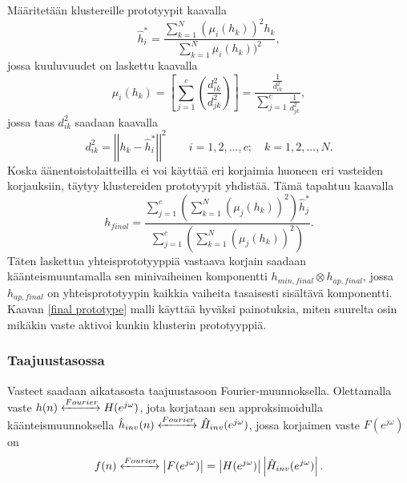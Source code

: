 \documentclass[finnish,12pt]{article}
\begin{document}
Määritetään klustereille prototyypit kaavalla \begin{equation}
\label{cluster prototype}
\hat{h}_i^* = \frac{\sum\limits_{k=1}^N (\mu_i(h_k))^2 h_k}{\sum\limits_{k=1}^N \mu_i(h_k))^2},
\end{equation} jossa kuuluvuudet on laskettu kaavalla \begin{equation}
\mu_i(h_k) = \left[ \sum\limits_{j=1}^c (\frac{d_{ik}^2}{d_{jk}^2})\right] = \frac{\frac{1}{d_{ik}^2}}{\sum\limits_{j=1}^c \frac{1}{d_{jk}^2}},
\end{equation} jossa taas $d_{ik}^2$ saadaan kaavalla \begin{equation}
\label{cluster prototype expected value}
d_{ik}^2 = \left|\left|h_k - \hat{h}_i^*\right|\right|^2 \qquad i = 1, 2, ..., c; \quad k = 1, 2, ..., N.
\end{equation} Koska äänentoistolaitteilla ei voi käyttää eri korjaimia huoneen eri vasteiden korjauksiin, täytyy klustereiden prototyypit yhdistää. Tämä tapahtuu kaavalla \begin{equation}
\label{final prototype}
h_{final} = \frac{\sum\limits_{j=1}^c (\sum\limits_{k=1}^N (\mu_j(h_k))^2) \hat{h}_j^*}{\sum\limits_{j=1}^c (\sum\limits_{k=1}^N (\mu_j(h_k))^2)}.
\end{equation} Täten laskettua yhteisprototyyppiä vastaava korjain saadaan käänteismuuntamalla  sen minivaiheinen komponentti $h_{min,final} \otimes h_{ap,final}$, jossa $h_{ap,final}$ on yhteisprototyypin kaikkia vaiheita tasaisesti sisältävä komponentti. Kaavan \eqref{final prototype} malli käyttää hyväksi painotuksia, miten suurelta osin mikäkin vaste aktivoi kunkin klusterin prototyyppiä. \cite{SBharitkar2001, ACarini2012}

\subsubsection{Taajuustasossa}

Vasteet saadaan aikatasosta taajuustasoon Fourier-muunnoksella. Olettamalla vaste $h(n) \xleftrightarrow{Fourier} H(e^{j \omega})$, jota korjataan sen approksimoidulla käänteismuunnoksella $\hat{h}_{inv}(n) \xleftrightarrow{Fourier} \hat{H}_{inv}(e^{j \omega})$, jossa korjaimen vaste $F(e^{j \omega})$ on \begin{equation}
f(n) \xleftrightarrow{Fourier} \left| F(e^{j \omega}) \right| = \left| H(e^{j \omega}) \right| \left| \hat{H}_{inv}(e^{j \omega}) \right|.
\end{equation} %
\end{document}
